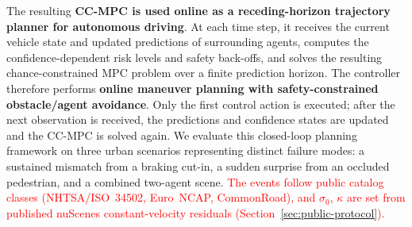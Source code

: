\documentclass[letterpaper, 10 pt, conference]{ieeeconf}
\begin{document}
The resulting \textbf{CC-MPC is used online as a receding-horizon trajectory planner for autonomous driving}. At each time step, it receives the current vehicle state and updated predictions of surrounding agents, computes the confidence-dependent risk levels and safety back-offs, and solves the resulting chance-constrained MPC problem over a finite prediction horizon. The controller therefore performs \textbf{online maneuver planning with safety-constrained obstacle/agent avoidance}. Only the first control action is executed; after the next observation is received, the predictions and confidence states are updated and the CC-MPC is solved again. We evaluate this closed-loop planning framework on three urban scenarios representing distinct failure modes: a sustained mismatch from a braking cut-in, a sudden surprise from an occluded pedestrian, and a combined two-agent scene. \textcolor{red}{The events follow public catalog classes (NHTSA/ISO~34502, Euro~NCAP, CommonRoad), and $\sigma_0$, $\kappa$ are set from published nuScenes constant-velocity residuals (Section~\ref{sec:public-protocol}).}
\end{document}
